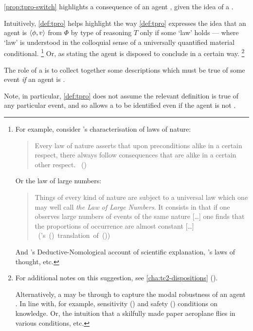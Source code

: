 \begin{note}
  \autoref{prop:tpro-switch} highlights a consequence of an agent \tCV{}, given the idea of a \tpro{}.

  Intuitively, \autoref{def:tpro} helps highlight the way \autoref{def:tpro} expresses the idea that an agent is \tCV{} \(\langle\phi, v\rangle\) from \(\Phi\) by type of reasoning \(T\) only if some `law' holds --- where `law' is understood in the colloquial sense of a universally quantified material conditional.%
  \footnote{
    For example, consider \citeauthor{Helmholtz:1977aa}'s characterisation of laws of nature:%
    \begin{quote}
      \nocite{Wilson:2006aa}
      Every law of nature asserts that upon preconditions alike in a certain respect, there always follow consequences that are alike in a certain other respect.%
      \mbox{ }\hfill\mbox{(\citeyear[122]{Helmholtz:1977aa})}
    \end{quote}
    Or the law of large numbers:
    \begin{quote}
      Things of every kind of nature are subject to a universal law which one may well call \emph{the Law of Large Numbers}.
      It consists in that if one observes large numbers of events of the same nature [\dots] one finds that the proportions of occurrence are almost constant [\dots]%
      \mbox{ }\hfill\mbox{(\citeauthor{Seneta:2013aa}'s (\citeyear[9--10]{Seneta:2013aa}) translation of (\cite[7]{Poisson:1837aa}))}
    \end{quote}
    And \citeauthor{Hempel:1965aa}'s Deductive-Nomological account of scientific explanation, \citeauthor{Boole:1854aa}'s laws of thought, etc.
  }
  Or, as stating the agent is disposed to conclude in a certain way.%
  \footnote{
    For additional notes on this suggestion, see \autoref{cha:tc2-dispositions} ().

    Alternatively, a \tpro{} may be through to capture the modal robustness of an agent \tCV{}.
    In line with, for example, sensitivity (\cite{Nozick:1981aa}) and safety (\cite{Sosa:1999aa}) conditions on knowledge.
    Or, the intuition that a skilfully made paper aeroplane flies in various conditions, etc.
  }

  The role of a \tpro{} is to collect together some descriptions which must be true of some event \emph{if} an agent is \tCV{}.

  Note, in particular, \autoref{def:tpro} does not assume the relevant definition is true of any particular event, and so allows a \tpro{} to be identified even if the agent is not \tCV{}.
\end{note}


